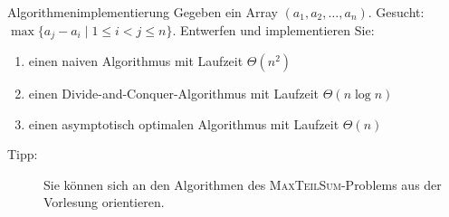 \documentclass[11pt,a4paper]{article}
\begin{document}
\begin{aufgabe}{2}{Algorithmenimplementierung}
    Gegeben ein Array $\left(a_1, a_2, \ldots, a_n\right)$. Gesucht: $\max \{a_j - a_i \mid 1 \leq i < j \leq n\}$. Entwerfen und implementieren Sie:
    \begin{enumerate}
        \item einen naiven Algorithmus mit Laufzeit $\Theta(n^2)$
        \item einen Divide-and-Conquer-Algorithmus mit Laufzeit $\Theta(n \log n)$
        \item einen asymptotisch optimalen Algorithmus mit Laufzeit $\Theta(n)$
    \end{enumerate}
    \begin{description}
        \item[Tipp:] 
        Sie können sich an den Algorithmen des \textsc{MaxTeilSum}-Problems aus der Vorlesung orientieren.
    \end{description}
\end{aufgabe}
\end{document}
